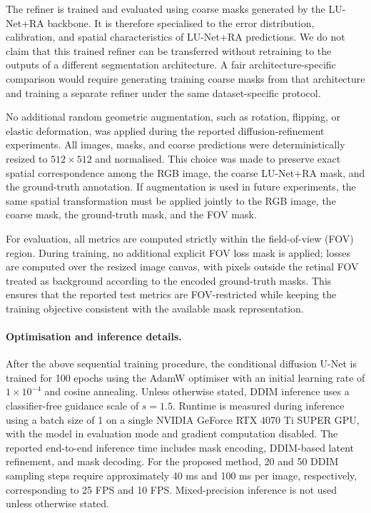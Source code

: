 \documentclass[journal,article,submit,pdftex,moreauthors]{Definitions/mdpi}
\begin{document}
The refiner is trained and evaluated using coarse masks generated by the LU-Net+RA backbone. It is therefore specialised to the error distribution, calibration, and spatial characteristics of LU-Net+RA predictions. We do not claim that this trained refiner can be transferred without retraining to the outputs of a different segmentation architecture. A fair architecture-specific comparison would require generating training coarse masks from that architecture and training a separate refiner under the same dataset-specific protocol.

No additional random geometric augmentation, such as rotation, flipping, or elastic deformation, was applied during the reported diffusion-refinement experiments. All images, masks, and coarse predictions were deterministically resized to $512\times512$ and normalised. This choice was made to preserve exact spatial correspondence among the RGB image, the coarse LU-Net+RA mask, and the ground-truth annotation. If augmentation is used in future experiments, the same spatial transformation must be applied jointly to the RGB image, the coarse mask, the ground-truth mask, and the FOV mask.

For evaluation, all metrics are computed strictly within the field-of-view (FOV) region. During training, no additional explicit FOV loss mask is applied; losses are computed over the resized image canvas, with pixels outside the retinal FOV treated as background according to the encoded ground-truth masks. This ensures that the reported test metrics are FOV-restricted while keeping the training objective consistent with the available mask representation.

\paragraph{Optimisation and inference details.}
After the above sequential training procedure, the conditional diffusion U-Net is trained for 100 epochs using the AdamW optimiser with an initial learning rate of $1\times10^{-4}$ and cosine annealing. Unless otherwise stated, DDIM inference uses a classifier-free guidance scale of $s=1.5$. Runtime is measured during inference using a batch size of 1 on a single NVIDIA GeForce RTX 4070 Ti SUPER GPU, with the model in evaluation mode and gradient computation disabled. The reported end-to-end inference time includes mask encoding, DDIM-based latent refinement, and mask decoding. For the proposed method, 20 and 50 DDIM sampling steps require approximately 40 ms and 100 ms per image, respectively, corresponding to 25 FPS and 10 FPS. Mixed-precision inference is not used unless otherwise stated.
\end{document}
